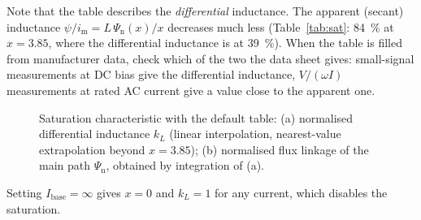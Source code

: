 \documentclass[11pt,a4paper]{article}
\begin{document}
Note that the table describes the \emph{differential} inductance. The apparent
(secant) inductance $\psi/i_\mathrm{m} = L\,\Psi_\mathrm{n}(x)/x$ decreases much less
(Table~\ref{tab:sat}: \SI{84}{\percent} at $x = 3.85$, where the differential
inductance is at \SI{39}{\percent}). When the table is filled from manufacturer data,
check which of the two the data sheet gives: small-signal measurements at DC bias give
the differential inductance, $V/(\omega I)$ measurements at rated AC current give a
value close to the apparent one.

\begin{figure}[htbp]
\centering
{}
\hfill
{}
\caption{Saturation characteristic with the default table: (a) normalised differential
inductance $k_L$ (linear interpolation, nearest-value extrapolation beyond $x = 3.85$);
(b) normalised flux linkage of the main path $\Psi_\mathrm{n}$, obtained by integration
of (a).}
\label{fig:sat}
\end{figure}

Setting $I_\mathrm{base} = \infty$ gives $x = 0$ and $k_L = 1$ for any current, which
disables the saturation.
\end{document}
